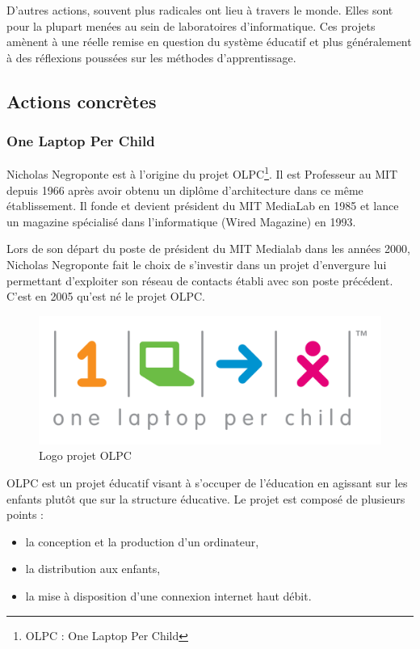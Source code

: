 D'autres actions, souvent plus radicales ont lieu à travers le monde. Elles sont pour la plupart menées au sein de laboratoires d'informatique. Ces projets amènent à une réelle remise en question du système éducatif et plus généralement à des réflexions poussées sur les méthodes d'apprentissage.

\subsection{Actions concrètes}

\subsubsection{One Laptop Per Child}

Nicholas Negroponte est à l'origine du projet OLPC\footnote{OLPC : One Laptop Per Child}. Il est Professeur au MIT depuis 1966 après avoir obtenu un diplôme d'architecture dans ce même établissement. Il fonde et devient président du MIT MediaLab en 1985 et lance un magazine spécialisé dans l'informatique (Wired Magazine) en 1993.

Lors de son départ du poste de président du MIT Medialab dans les années 2000, Nicholas Negroponte fait le choix de s'investir dans un projet d'envergure lui permettant d'exploiter son réseau de contacts établi avec son poste précédent. C'est en 2005 qu'est né le projet OLPC.

\begin{figure}[H]
  \centering
  \includegraphics[width=.5\textwidth]{../resources/illustrations/OLPC_logo}
  \caption{Logo projet OLPC}
\end{figure}

OLPC est un projet éducatif visant à s'occuper de l'éducation en agissant sur les enfants plutôt que sur la structure éducative. Le projet est composé de plusieurs points : 



\begin{itemize}
  \item la conception et la production d'un ordinateur,
  \item la distribution aux enfants,
  \item la mise à disposition d'une connexion internet haut débit.
\end{itemize}

